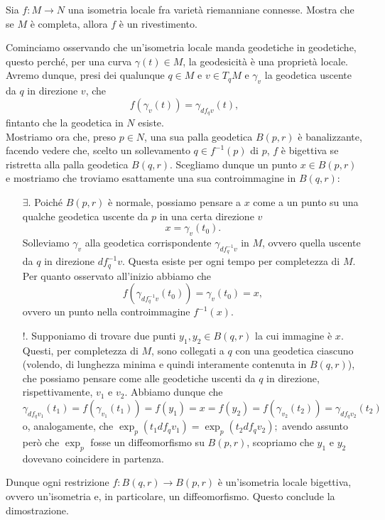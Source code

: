 \documentclass[a4paper]{article}
\begin{document}
\begin{ex}[11.2]{Sia $ f \colon M \to N $ una isometria locale fra varietà riemanniane connesse. Mostra che se $ M $ è completa, allora $ f $ è un rivestimento.}
	
	Cominciamo osservando che un'isometria locale manda geodetiche in geodetiche, questo perché, per una curva $ \gamma(t) \in M $, la geodesicità è una proprietà locale.
	Avremo dunque, presi dei qualunque $ q \in M $ e $ v \in T_qM $ e $ \gamma_v $ la geodetica uscente da $ q $ in direzione $ v $, che \[ f(\gamma_v(t)) = \gamma_{df_qv}(t), \]
	fintanto che la geodetica in $ N $ esiste.\\
	
	Mostriamo ora che, preso $ p \in N $, una sua palla geodetica $ B(p, r) $ è banalizzante, facendo vedere che, scelto un sollevamento $ q \in f^{-1}(p) $ di $ p $, $ f $ è bigettiva se ristretta alla palla geodetica $ B(q, r) $. Scegliamo dunque un punto $ x \in B(p, r) $ e mostriamo che troviamo esattamente una sua controimmagine in $ B(q, r) $:
	\begin{itemize}
		\item[$ \exists. $] Poiché $ B(p, r) $ è normale, possiamo pensare a $ x $ come a un punto su una qualche geodetica uscente da $ p $ in una certa direzione $ v $ \[ x = \gamma_v(t_0). \]
		Solleviamo $ \gamma_v $ alla geodetica corrispondente $ \gamma_{df_q^{-1}v} $ in $ M $, ovvero quella uscente da $ q $ in direzione $ df_q^{-1}v $. Questa esiste per ogni tempo per completezza di $ M $. Per quanto osservato all'inizio abbiamo che
		\[ f(\gamma_{df_q^{-1}v}(t_0)) = \gamma_{v}(t_0) = x, \]
		ovvero un punto nella controimmagine $ f^{-1}(x) $.
		
		\item[$!.$] Supponiamo di trovare due punti $ y_1, y_2 \in B(q, r) $ la cui immagine è $ x. $ Questi, per completezza di $ M $, sono collegati a $ q $ con una geodetica ciascuno (volendo, di lunghezza minima e quindi interamente contenuta in $ B(q, r) $), che possiamo pensare come alle geodetiche uscenti da $ q $ in direzione, rispettivamente, $ v_1 $ e $ v_2 $. Abbiamo dunque che
		\[ \gamma_{df_qv_1}(t_1) = f(\gamma_{v_1}(t_1)) = f(y_1) =  x = f(y_2) = f(\gamma_{v_2}(t_2)) = \gamma_{df_qv_2}(t_2) \]
		o, analogamente, che $ \exp_p(t_1 df_qv_1) = \exp_p(t_2 df_qv_2); $ avendo assunto però che $ \exp_p $ fosse un diffeomorfismo su $ B(p, r) $, scopriamo che $ y_1 $ e $ y_2 $ dovevano coincidere in partenza.
	\end{itemize}
	Dunque ogni restrizione $ f\colon B(q, r) \to B(p, r)$ è un'isometria locale bigettiva, ovvero un'isometria e, in particolare, un diffeomorfismo. Questo conclude la dimostrazione.
\end{ex}
\end{document}
